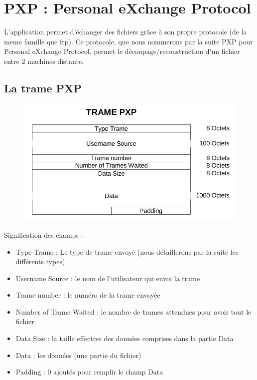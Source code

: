 \documentclass[a4paper, 11pt, french]{report}
\begin{document}
	\section{PXP : Personal eXchange Protocol} %
		L'application permet d'échanger des fichiers grâce à son propre protocole (de la meme famille que ftp). 
		Ce protocole, que nous nommerons par la suite PXP pour Personal eXchange Protocol, permet le découpage/reconstruction d'un fichier entre 2 machines distante.
	
		\subsection{La trame PXP}
			\begin{figure}[!h]
				\centering
				\includegraphics[scale=0.5]{TramePXP.png}
				\label{Trame PXP}
			\end{figure}
		
			Signification des champs :
			\begin{itemize}
				\item Type Trame : Le type de trame envoyé (nous détaillerons par la suite les différents types)
				\item Username Source : le nom de l'utilisateur qui envoi la trame
				\item Trame number : le numéro de la trame envoyée
				\item Number of Trame Waited : le nombre de trames attendues pour avoir tout le fichier
				\item Data Size : la taille effective des données comprises dans la partie Data
				\item Data : les données (une partie du fichier)
				\item Padding : 0 ajoutés pour remplir le champ Data
			\end{itemize}
			
\end{document}
